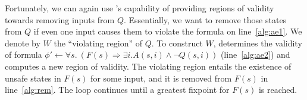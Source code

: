 Fortunately, we can again use \aeval's capability of providing regions of validity
towards removing inputs from $Q$.  Essentially, we want to remove those states from $Q$ if even one input causes them to violate the formula on line~\ref{alg:ae1}.  We denote by $W$ the ``violating region'' of $Q$.  To construct $W$, \aeval  determines
the validity of formula $\phi' \gets \forall s. \ (F(s) \Rightarrow \exists
i. A(s,i) \land \lnot Q(s,i))$ (line~\ref{alg:ae2}) and computes
a new region of validity. 
The violating region entails
the existence of unsafe states in $F(s)$ for some input, and it is removed from $F(s)$ in line~\ref{alg:rem}.   The loop continues until a greatest fixpoint for $F(s)$ is reached.  %






